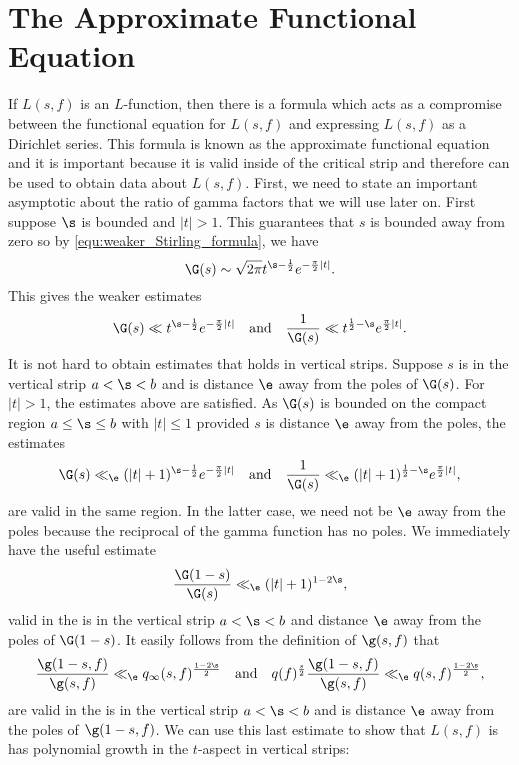   \section{The Approximate Functional Equation}
    If $L(s,f)$ is an $L$-function, then there is a formula which acts as a compromise between the functional equation for $L(s,f)$ and expressing $L(s,f)$ as a Dirichlet series. This formula is known as the approximate functional equation and it is important because it is valid inside of the critical strip and therefore can be used to obtain data about $L(s,f)$. First, we need to state an important asymptotic about the ratio of gamma factors that we will use later on. First suppose $\s$ is bounded and $|t| > 1$. This guarantees that $s$ is bounded away from zero so by \cref{equ:weaker_Stirling_formula}, we have
    \[
      \G(s) \sim \sqrt{2\pi}t^{\s-\frac{1}{2}}e^{-\frac{\pi}{2}|t|}.
    \]
    This gives the weaker estimates
    \[
      \G(s) \ll t^{\s-\frac{1}{2}}e^{-\frac{\pi}{2}|t|} \quad \text{and} \quad \frac{1}{\G(s)} \ll t^{\frac{1}{2}-\s}e^{\frac{\pi}{2}|t|} .
    \]
    It is not hard to obtain estimates that holds in vertical strips. Suppose $s$ is in the vertical strip $a < \s < b$ and is distance $\e$ away from the poles of $\G(s)$. For $|t| > 1$, the estimates above are satisfied. As $\G(s)$ is bounded on the compact region $a \le \s \le b$ with $|t| \le 1$ provided $s$ is distance $\e$ away from the poles, the estimates
    \begin{equation}\label{equ:modified_gamma_estimates}
      \G(s) \ll_{\e} (|t|+1)^{\s-\frac{1}{2}}e^{-\frac{\pi}{2}|t|} \quad \text{and} \quad \frac{1}{\G(s)} \ll_{\e} (|t|+1)^{\frac{1}{2}-\s}e^{\frac{\pi}{2}|t|},
    \end{equation}
    are valid in the same region. In the latter case, we need not be $\e$ away from the poles because the reciprocal of the gamma function has no poles. We immediately have the useful estimate
    \[
      \frac{\G(1-s)}{\G(s)} \ll_{\e} (|t|+1)^{1-2\s},
    \]
    valid in the is in the vertical strip $a < \s < b$ and distance $\e$ away from the poles of $\G(1-s)$. It easily follows from the definition of $\g(s,f)$ that
    \begin{equation}\label{equ:gamma_factor_analytic_conductor_estimate}
      \frac{\g(1-s,f)}{\g(s,f)} \ll_{\e} q_{\infty}(s,f)^{\frac{1-2\s}{2}} \quad \text{and} \quad q(f)^{\frac{s}{2}}\frac{\g(1-s,f)}{\g(s,f)} \ll_{\e} q(s,f)^{\frac{1-2\s}{2}},
    \end{equation}
    are valid in the is in the vertical strip $a < \s < b$ and is distance $\e$ away from the poles of $\g(1-s,f)$. We can use this last estimate to show that $L(s,f)$ is has polynomial growth in the $t$-aspect in vertical strips:


